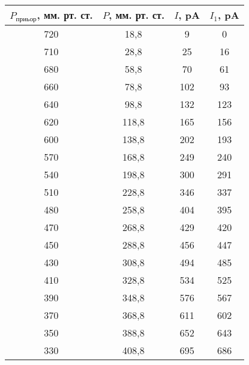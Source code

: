\begin{table}[h!]
    \begin{tabular}{|c|c|c|c|}
    \hline
    $P_{\text{приьор}}$, мм. рт. ст. & $P$, мм. рт. ст. & $I$, pA & $I_1$, pA \\ \hline
    720                              & 18,8             & 9       & 0         \\ \hline
    710                              & 28,8             & 25      & 16        \\ \hline
    680                              & 58,8             & 70      & 61        \\ \hline
    660                              & 78,8             & 102     & 93        \\ \hline
    640                              & 98,8             & 132     & 123       \\ \hline
    620                              & 118,8            & 165     & 156       \\ \hline
    600                              & 138,8            & 202     & 193       \\ \hline
    570                              & 168,8            & 249     & 240       \\ \hline
    540                              & 198,8            & 300     & 291       \\ \hline
    510                              & 228,8            & 346     & 337       \\ \hline
    480                              & 258,8            & 404     & 395       \\ \hline
    470                              & 268,8            & 429     & 420       \\ \hline
    450                              & 288,8            & 456     & 447       \\ \hline
    430                              & 308,8            & 494     & 485       \\ \hline
    410                              & 328,8            & 534     & 525       \\ \hline
    390                              & 348,8            & 576     & 567       \\ \hline
    370                              & 368,8            & 611     & 602       \\ \hline
    350                              & 388,8            & 652     & 643       \\ \hline
    330                              & 408,8            & 695     & 686       \\ \hline

\end{tabular}
\end{table}
